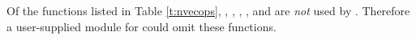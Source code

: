 Of the functions listed in Table \ref{t:nvecops}, , 
, , , and
 are {\em not} used by 
{\idas}. Therefore a user-supplied {\nvector} module for {\idas} could
omit these functions. 














